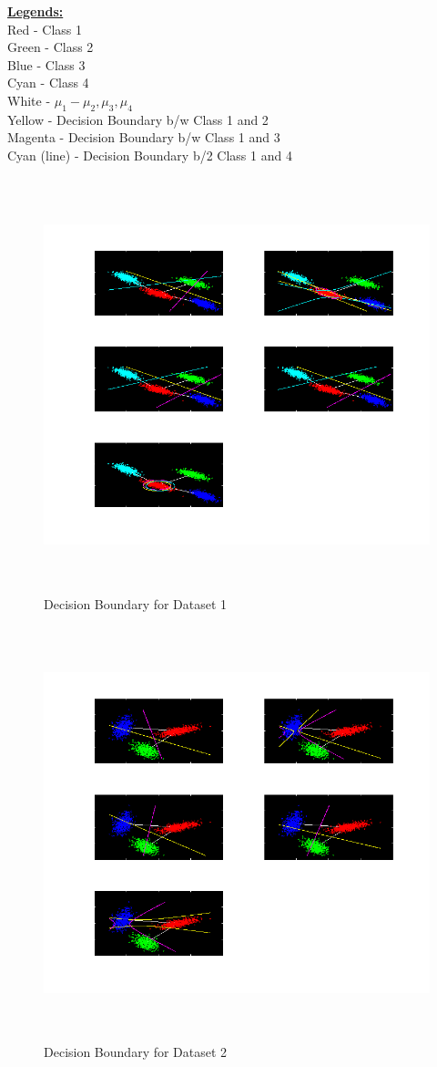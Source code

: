 \documentclass[11pt,a4paper]{article}
\begin{document}
\underline{\textbf{Legends:}}\\
Red - Class 1\\
Green - Class 2\\
Blue - Class 3\\
Cyan - Class 4\\
White - $\mu_1 - \mu_2, \mu_3, \mu_4$\\
Yellow - Decision Boundary b/w Class 1 and 2 \\
Magenta - Decision Boundary b/w Class 1 and 3 \\
Cyan (line) - Decision Boundary b/2 Class 1 and 4 

\begin{figure}[H]
	\includegraphics[height=12cm]{Figures/LS_DB.png}
	\caption{Decision Boundary for Dataset 1}
\end{figure}

\begin{figure}[H]
	\includegraphics[height=12cm]{Figures/NLS_DB.png}
	\caption{Decision Boundary for Dataset 2}
\end{figure}
\end{document}
